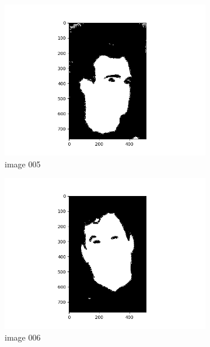 \documentclass[11pt]{report}
\begin{document}
\begin{figure}[H]
\begin{subfigure}{0.3\textwidth}
        \includegraphics[width=\textwidth]{Task 2 Plots/bin_mask_005.png}
        \caption{image 005}
        \label{fig:binmask5}
    \end{subfigure}
    \begin{subfigure}{0.3\textwidth}
        \centering
        \includegraphics[width=\textwidth]{Task 2 Plots/bin_mask_006.png}
        \caption{image 006}
        \label{fig:binmask6}
    \end{subfigure}
    \begin{subfigure}{0.3\textwidth}
        \centering

\end{subfigure}
\end{figure}
\end{document}
